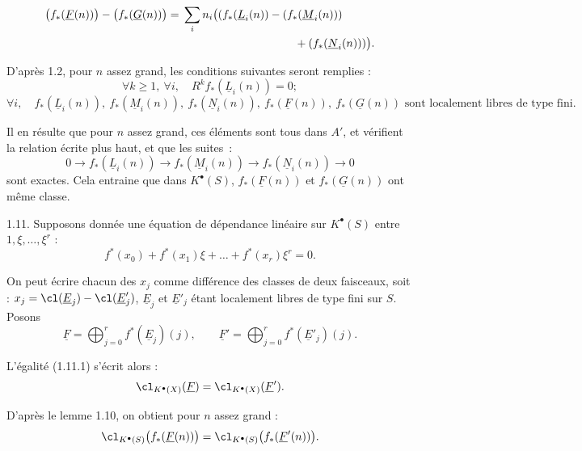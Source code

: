
\[
\begin{aligned}
  \bigl(f_*(\underline{F}(n))\bigr)-\bigl(f_*(\underline{G}(n))\bigr)
  ={}&\sum_i n_i\bigl((f_*(\underline{L}_i(n))-(f_*(\underline{M}_i(n)))\\
      &\hspace{35mm}+(f_*(\underline{N}_i(n)))\bigr).
\end{aligned}
\]

D'après 1.2,
pour \(n\) assez grand, les conditions suivantes seront remplies :
\[
  \forall k\geq1,\ \forall i,
  \quad R^k f_*(\underline{L}_i(n))=0;
\]
\[
  \forall i,
  \quad f_*(\underline{L}_i(n)),\ f_*(\underline{M}_i(n)),\ f_*(\underline{N}_i(n)),\ f_*(\underline{F}(n)),\ f_*(\underline{G}(n))
  \text{ sont localement libres de type fini.}
\]

Il en résulte que pour \(n\) assez grand, ces éléments sont tous dans \(A'\), et vérifient la relation écrite plus haut, et que les suites~:
\[
  0\longrightarrow f_*(\underline{L}_i(n))\longrightarrow f_*(\underline{M}_i(n))\longrightarrow f_*(\underline{N}_i(n))\longrightarrow0
\]
sont exactes. Cela entraine que dans \(K^{\bullet}(S)\), \(f_*(\underline{F}(n))\) et \(f_*(\underline{G}(n))\) ont même classe.

1.11. Supposons donnée une équation de dépendance linéaire sur \(K^{\bullet}(S)\) entre \(1,\xi,\ldots,\xi^r\) :
\begin{equation}\tag{1.11.1}
  f^*(x_0)+f^*(x_1)\xi+\ldots+f^*(x_r)\xi^r=0.
\end{equation}

On peut écrire chacun des \(x_j\) comme différence des classes de deux faisceaux, soit : \(x_j=\cl(\underline{E}_j)-\cl(\underline{E}'_j)\), \(\underline{E}_j\) et \(\underline{E}'_j\) étant localement libres de type fini sur \(S\). Posons
\[
  \underline{F}=\bigoplus_{j=0}^r f^*(\underline{E}_j)(j),
  \qquad
  \underline{F}'=\bigoplus_{j=0}^r f^*(\underline{E}'_j)(j).
\]

L'égalité (1.11.1) s'écrit alors :
\[
  \cl_{K^{\bullet}(X)}(\underline{F})=\cl_{K^{\bullet}(X)}(\underline{F}').
\]

D'après le lemme 1.10, on obtient pour \(n\) assez grand :
\[
  \cl_{K^{\bullet}(S)}\bigl(f_*(\underline{F}(n))\bigr)=\cl_{K^{\bullet}(S)}\bigl(f_*(\underline{F}'(n))\bigr).
\]

